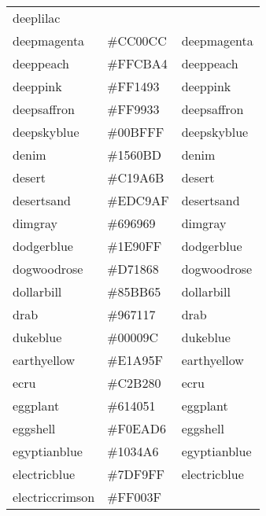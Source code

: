 \documentclass[
]{article}
\begin{document}
\begin{longtable}[]{@{}lll@{}}
\textcolor[rgb]{0.6,0.33,0.73}{deeplilac             }\tabularnewline
deepmagenta & \colorbox[rgb]{0.8,0.0,0.8}{\#CC00CC} &
\textcolor[rgb]{0.8,0.0,0.8}{deepmagenta           }\tabularnewline
deeppeach & \colorbox[rgb]{1.0,0.8,0.64}{\#FFCBA4} &
\textcolor[rgb]{1.0,0.8,0.64}{deeppeach             }\tabularnewline
deeppink & \colorbox[rgb]{1.0,0.08,0.58}{\#FF1493} &
\textcolor[rgb]{1.0,0.08,0.58}{deeppink              }\tabularnewline
deepsaffron & \colorbox[rgb]{1.0,0.6,0.2}{\#FF9933} &
\textcolor[rgb]{1.0,0.6,0.2}{deepsaffron           }\tabularnewline
deepskyblue & \colorbox[rgb]{0.0,0.75,1.0}{\#00BFFF} &
\textcolor[rgb]{0.0,0.75,1.0}{deepskyblue           }\tabularnewline
denim & \colorbox[rgb]{0.08,0.38,0.74}{\#1560BD} &
\textcolor[rgb]{0.08,0.38,0.74}{denim                 }\tabularnewline
desert & \colorbox[rgb]{0.76,0.6,0.42}{\#C19A6B} &
\textcolor[rgb]{0.76,0.6,0.42}{desert                }\tabularnewline
desertsand & \colorbox[rgb]{0.93,0.79,0.69}{\#EDC9AF} &
\textcolor[rgb]{0.93,0.79,0.69}{desertsand            }\tabularnewline
dimgray & \colorbox[rgb]{0.41,0.41,0.41}{\#696969} &
\textcolor[rgb]{0.41,0.41,0.41}{dimgray               }\tabularnewline
dodgerblue & \colorbox[rgb]{0.12,0.56,1.0}{\#1E90FF} &
\textcolor[rgb]{0.12,0.56,1.0}{dodgerblue            }\tabularnewline
dogwoodrose & \colorbox[rgb]{0.84,0.09,0.41}{\#D71868} &
\textcolor[rgb]{0.84,0.09,0.41}{dogwoodrose           }\tabularnewline
dollarbill & \colorbox[rgb]{0.52,0.73,0.4}{\#85BB65} &
\textcolor[rgb]{0.52,0.73,0.4}{dollarbill            }\tabularnewline
drab & \colorbox[rgb]{0.59,0.44,0.09}{\#967117} &
\textcolor[rgb]{0.59,0.44,0.09}{drab                  }\tabularnewline
dukeblue & \colorbox[rgb]{0.0,0.0,0.61}{\#00009C} &
\textcolor[rgb]{0.0,0.0,0.61}{dukeblue              }\tabularnewline
earthyellow & \colorbox[rgb]{0.88,0.66,0.37}{\#E1A95F} &
\textcolor[rgb]{0.88,0.66,0.37}{earthyellow           }\tabularnewline
ecru & \colorbox[rgb]{0.76,0.7,0.5}{\#C2B280} &
\textcolor[rgb]{0.76,0.7,0.5}{ecru                  }\tabularnewline
eggplant & \colorbox[rgb]{0.38,0.25,0.32}{\#614051} &
\textcolor[rgb]{0.38,0.25,0.32}{eggplant              }\tabularnewline
eggshell & \colorbox[rgb]{0.94,0.92,0.84}{\#F0EAD6} &
\textcolor[rgb]{0.94,0.92,0.84}{eggshell              }\tabularnewline
egyptianblue & \colorbox[rgb]{0.06,0.2,0.65}{\#1034A6} &
\textcolor[rgb]{0.06,0.2,0.65}{egyptianblue          }\tabularnewline
electricblue & \colorbox[rgb]{0.49,0.98,1.0}{\#7DF9FF} &
\textcolor[rgb]{0.49,0.98,1.0}{electricblue          }\tabularnewline
electriccrimson & \colorbox[rgb]{1.0,0.0,0.25}{\#FF003F} &

\end{longtable}
\end{document}
